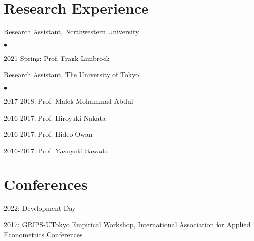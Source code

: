 \documentclass[margin,line]{res}
\newenvironment{list1}{
  \begin{list}{\ding{113}}{%
      \setlength{\itemsep}{.025in}
      \setlength{\parsep}{0in} \setlength{\parskip}{0in}
      \setlength{\topsep}{0in} \setlength{\partopsep}{0in}
      \setlength{\leftmargin}{0.17in}}}{\end{list}}
\newenvironment{list2}{
  \begin{list}{$\bullet$}{%
      \setlength{\itemsep}{0in}
      \setlength{\parsep}{0in} \setlength{\parskip}{0in}
      \setlength{\topsep}{0in} \setlength{\partopsep}{0in}
      \setlength{\leftmargin}{0.2in}}}{\end{list}}
\begin{document}
\begin{resume}
\section{Research Experience}
\begin{list1}
\item[] Research Assistant, Northwestern University
	\begin{list2}
		\item[] 2021 Spring: Prof. Frank Limbrock
	\end{list2}
\item[] Research Assistant, The University of Tokyo
	\begin{list2}
	        \item[] 2017-2018: Prof. Malek Mohammad Abdul
		\item[] 2016-2017: Prof. Hiroyuki Nakata
		\item[] 2016-2017: Prof. Hideo Owan
		\item[] 2016-2017: Prof. Yasuyuki Sawada
	\end{list2}
\end{list1}

\section{Conferences}
\begin{list1}
\item[] 2022: Development Day
\item[] 2017: GRIPS-UTokyo Empirical Workshop, International Association for Applied Econometrics Conferences
\end{list1}

\pagebreak


\end{resume}
\end{document}
